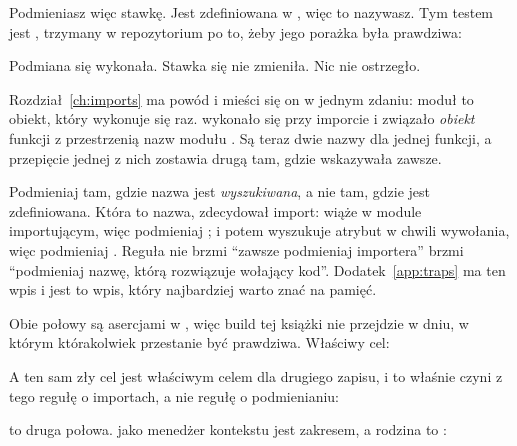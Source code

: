 \noindent
Podmieniasz więc stawkę. Jest zdefiniowana w , więc to nazywasz.
Tym testem jest , trzymany w repozytorium po to, żeby
jego porażka była prawdziwa:


\noindent
Podmiana się wykonała. Stawka się nie zmieniła. Nic nie ostrzegło.

Rozdział~\ref{ch:imports} ma powód i mieści się on w jednym zdaniu: moduł to
obiekt, który wykonuje się raz. 
wykonało się przy imporcie i związało \emph{obiekt} funkcji z przestrzenią
nazw modułu . Są teraz dwie nazwy dla jednej funkcji, a
przepięcie jednej z nich zostawia drugą tam, gdzie wskazywała zawsze.


\begin{trapbox}
Podmieniaj tam, gdzie nazwa jest \emph{wyszukiwana}, a nie tam, gdzie jest
zdefiniowana. Która to nazwa, zdecydował import: 
wiąże w module importującym, więc podmieniaj ;
 i potem  wyszukuje atrybut w chwili wywołania,
więc podmieniaj . Reguła nie brzmi \enquote{zawsze podmieniaj
importera} \dash{} brzmi \enquote{podmieniaj nazwę, którą rozwiązuje
wołający kod}. Dodatek~\ref{app:traps} ma ten wpis i jest to wpis, który
najbardziej warto znać na pamięć.
\end{trapbox}

\noindent
Obie połowy są asercjami w , więc build
tej książki nie przejdzie w dniu, w którym którakolwiek przestanie być
prawdziwa. Właściwy cel:


\noindent
A ten sam zły cel jest właściwym celem dla drugiego zapisu, i to właśnie
czyni z tego regułę o importach, a nie regułę o podmienianiu:


\noindent
{} to druga połowa.  jako menedżer kontekstu
jest zakresem, a rodzina  to :

